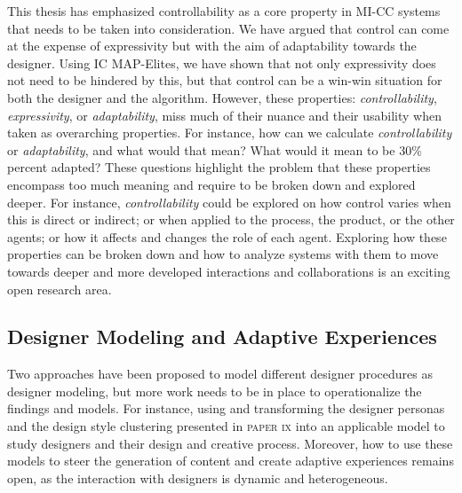 This thesis has emphasized controllability as a core property in MI-CC systems that needs to be taken into consideration. We have argued that control can come at the expense of expressivity but with the aim of adaptability towards the designer. Using IC MAP-Elites, we have shown that not only expressivity does not need to be hindered by this, but that control can be a win-win situation for both the designer and the algorithm. However, these properties: \emph{controllability}, \emph{expressivity}, or \emph{adaptability}, miss much of their nuance and their usability when taken as overarching properties. For instance, how can we calculate \emph{controllability} or \emph{adaptability}, and what would that mean? What would it mean to be 30\% percent adapted? These questions highlight the problem that these properties encompass too much meaning and require to be broken down and explored deeper. For instance, \emph{controllability} could be explored on how control varies when this is direct or indirect; or when applied to the process, the product, or the other agents; or how it affects and changes the role of each agent. Exploring how these properties can be broken down and how to analyze systems with them to move towards deeper and more developed interactions and collaborations is an exciting open research area.



\subsection{Designer Modeling and Adaptive Experiences}


Two approaches have been proposed to model different designer procedures as designer modeling, but more work needs to be in place to operationalize the findings and models. For instance, using and transforming the designer personas and the design style clustering
presented in \textsc{paper ix} into an applicable model to study designers and their design and creative process. Moreover, how to use these models to steer the generation of content and create adaptive experiences remains open, as the interaction with designers is dynamic and heterogeneous.

